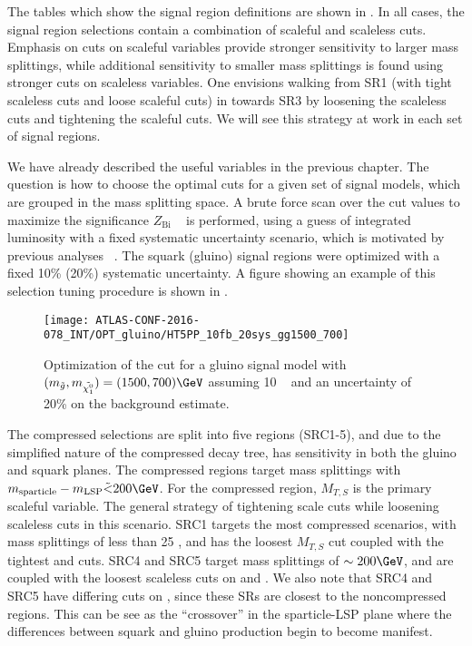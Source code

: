 The tables which show the signal region definitions are shown in .
In all cases, the signal region selections contain a combination of scaleful and scaleless cuts.
Emphasis on cuts on scaleful variables provide stronger sensitivity to larger mass splittings, while additional sensitivity to smaller mass splittings is found using stronger cuts on scaleless variables.
One envisions walking from SR1 (with tight scaleless cuts and loose scaleful cuts) in  towards SR3 by loosening the scaleless cuts and tightening the scaleful cuts.
We will see this strategy at work in each set of signal regions.

We have already described the useful variables in the previous chapter.
The question is how to choose the optimal cuts for a given set of signal models, which are grouped in the mass splitting space.
A brute force scan over the cut values to maximize the significance  $Z_{\text{Bi}}$ ~\cite{Cousins:2008zz} is performed, using a guess of integrated luminosity with a fixed systematic uncertainty scenario, which is motivated by previous analyses ~\cite{0-leptonPaper,0LPaper_13TeV}.
The squark (gluino) signal regions were optimized with a fixed 10\% (20\%) systematic uncertainty.
A figure showing an example of this selection tuning procedure is shown in .

\begin{figure}[tbp]
\caption{Optimization of the  cut for a gluino signal model with $(m_{\gluino}, m_{\lsp} ) = (1500,700) \GeV $ assuming 10 \ifb~ and an uncertainty of 20\% on the background estimate.
} \label{fig:sr_optimization}
\texttt{[image: ATLAS-CONF-2016-078\_INT/OPT\_gluino/HT5PP\_10fb\_20sys\_gg1500\_700]}
\end{figure}

The compressed selections are split into five regions (SRC1-5), and due to the simplified nature of the compressed decay tree, has sensitivity in both the gluino and squark planes.
The compressed regions target mass splittings with $m_{\text{sparticle}} - m_{\text{LSP}} \tilde{<} 200 \GeV$.
For the compressed region, $M_{T, S}$ is the primary scaleful variable.
The general strategy of tightening scale cuts while loosening scaleless cuts in this scenario.
SRC1 targets the most compressed scenarios, with mass splittings of less than 25 \GeV, and has the loosest $M_{T, S}$ cut coupled with the tightest \risr and \dphiISR cuts.
SRC4 and SRC5 target mass splittings of $\order 200 \GeV$, and are coupled with the loosest scaleless cuts on \risr and \dphiISR.
We also note that SRC4 and SRC5 have differing cuts on \NVjet, since these SRs are closest to the noncompressed regions.
This can be see as the ``crossover'' in the sparticle-LSP plane where the differences between squark and gluino production begin to become manifest.

